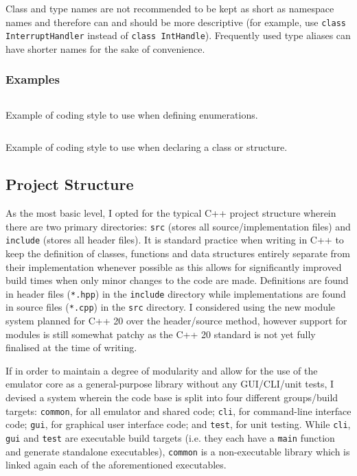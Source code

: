         Class and type names are not recommended to be kept as short as namespace names and therefore can and should be more descriptive (for example, use \texttt{class InterruptHandler} instead of \texttt{class IntHandle}). Frequently used type aliases can have shorter names for the sake of convenience.

    \subsubsection{Examples}
        \begin{listing}[ht]
            \inputminted{c++}{code/enum.cpp}
            \caption{Example of coding style to use when defining enumerations.}
            \label{lst:enum-example}
        \end{listing}

        \begin{listing}[ht]
            \inputminted{c++}{code/class.hpp}
            \caption{Example of coding style to use when declaring a class or structure.}
            \label{lst:class-example}
        \end{listing}

\subsection{Project Structure}
    \label{sec:project-structure}
    As the most basic level, I opted for the typical C++ project structure wherein there are two primary directories: \texttt{src} (stores all source/implementation files) and \texttt{include} (stores all header files). It is standard practice when writing in C++ to keep the definition of classes, functions and data structures entirely separate from their implementation whenever possible as this allows for significantly improved build times when only minor changes to the code are made. Definitions are found in header files (\texttt{*.hpp}) in the \texttt{include} directory while implementations are found in source files (\texttt{*.cpp}) in the \texttt{src} directory. I considered using the new module system planned for C++ 20 over the header/source method, however support for modules is still somewhat patchy as the C++ 20 standard is not yet fully finalised at the time of writing.

    If in order to maintain a degree of modularity and allow for the use of the emulator core as a general-purpose library without any GUI/CLI/unit tests, I devised a system wherein the code base is split into four different groups/build targets: \texttt{common}, for all emulator and shared code; \texttt{cli}, for command-line interface code; \texttt{gui}, for graphical user interface code; and \texttt{test}, for unit testing. While \texttt{cli}, \texttt{gui} and \texttt{test} are executable build targets (i.e. they each have a \texttt{main} function and generate standalone executables), \texttt{common} is a non-executable library which is linked again each of the aforementioned executables.

